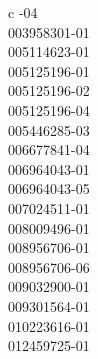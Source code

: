 \begin{deluxetable}{c}
\tablewidth{\linewidth}
-04\\
003958301-01\\
005114623-01\\
005125196-01\\
005125196-02\\
005125196-04\\
005446285-03\\
006677841-04\\
006964043-01\\
006964043-05\\
007024511-01\\
008009496-01\\
008956706-01\\
008956706-06\\
009032900-01\\
009301564-01\\
010223616-01\\
012459725-01\\
\enddata

\end{deluxetable}


